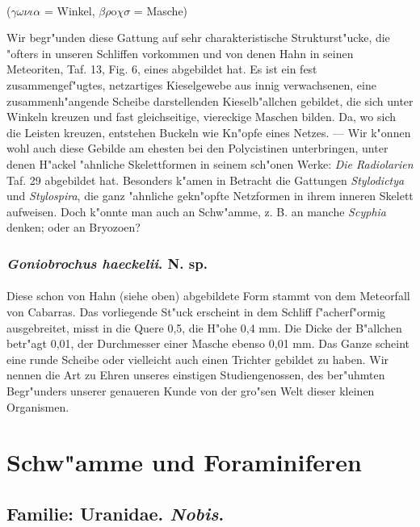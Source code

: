 \documentclass[a4paper, 11pt, oneside]{article}
\begin{document}
\paragraph{}
($\gamma\omega\nu\iota\alpha$ = Winkel, $\beta\rho$o$\chi\sigma$ = Masche)%

Wir begr"unden diese Gattung auf sehr charakteristische Strukturst"ucke, die "ofters in unseren Schliffen vorkommen und von denen Hahn in seinen Meteoriten, Taf. 13, Fig. 6, eines abgebildet hat. Es ist ein fest zusammengef"ugtes, netzartiges Kieselgewebe aus innig verwachsenen, eine zusammenh"angende Scheibe darstellenden Kieselb"allchen gebildet, die sich unter Winkeln kreuzen und fast gleichseitige, viereckige Maschen bilden. Da, wo sich die Leisten kreuzen, entstehen Buckeln wie Kn"opfe eines Netzes. --- Wir k"onnen wohl auch diese Gebilde am ehesten bei den Polycistinen unterbringen, unter denen H"ackel "ahnliche Skelettformen in seinem sch"onen Werke: \emph{Die Radiolarien} Taf. 29 abgebildet hat. Besonders k"amen in Betracht die Gattungen \emph{Stylodictya} und \emph{Stylospira}, die ganz "ahnliche gekn"opfte Netzformen in ihrem inneren Skelett aufweisen. Doch k"onnte man auch an Schw"amme, z. B. an manche \emph{Scyphia} denken; oder an Bryozoen?
\subsubsection{\emph{Goniobrochus haeckelii}. N. sp.}
\paragraph{}
Diese schon von Hahn (siehe oben) abgebildete Form stammt von dem Meteorfall von Cabarras. Das vorliegende St"uck erscheint in dem Schliff f"acherf"ormig ausgebreitet, misst in die Quere 0,5, die H"ohe 0,4 mm. Die Dicke der B"allchen betr"agt 0,01, der Durchmesser einer Masche ebenso 0,01 mm. Das Ganze scheint eine runde Scheibe oder vielleicht auch einen Trichter gebildet zu haben. Wir nennen die Art zu Ehren unseres einstigen Studiengenossen, des ber"uhmten Begr"unders unserer genaueren Kunde von der gro"sen Welt dieser kleinen Organismen.
\clearpage
\section{Schw"amme und Foraminiferen}
\subsection*{Familie: Uranidae. \emph{Nobis}.}
\end{document}

